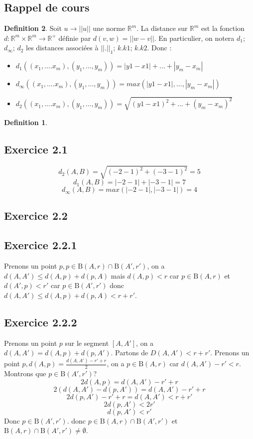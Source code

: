 \documentclass[]{book}
\theoremstyle{definition}
\newtheorem{defn}{Definition}
\newcommand{\bb}[1]{\mathbb{#1}}
\newcommand{\B}{\mathrm{B}}
\newcommand{\R}{\bb{R}}
\begin{document}
\subsection*{Rappel de cours}

\begin{defn}
Soit $u \to ||u||$ une norme $\R^m$. La distance sur $\R^m$ est la fonction $d : \R^m \times \R^m \to  \R^+$ d\'efinie par $d(v,w) = ||w - v||$.
En particulier, on notera $d_1$; $d_{\infty}$; $d_2$ les distances associées à $|| . ||_1$; $k . k1$; $k . k2$. Donc :
\begin{itemize}
\item $d_1((x_1, \ldots. x_m), (y_1, \ldots, y_m)) = |y1 - x1| + \ldots + |y_m - x_m|$
\item $d_{\infty}((x_1, \ldots. x_m), (y_1, \ldots, y_m)) = max(|y1 - x1|, \ldots, |y_m - x_m|)$
\item $d_2((x_1, \ldots. x_m), (y_1, \ldots, y_m)) = \sqrt{(y1 - x1)^2 + \ldots + (y_m - x_m)^2}$
\end{itemize}

\begin{defn}
\end{defn}



\end{defn}



\newpage
\subsection*{Exercice 2.1}
$$d_2(A,B)= \sqrt{(-2-1)^2+(-3-1)^2} = 5$$
$$d_1(A,B) = |-2-1|+|-3-1| = 7$$
$$d_{\infty}(A,B) = max(|-2-1|,|-3-1|) = 4$$

\subsection*{Exercice 2.2}
\subsection*{Exercice 2.2.1}
Prenons un point $p, p \in \B(A,r) \cap \B(A',r')$, on a $d(A,A') \leq d(A,p)+d(p,A)$ mais $d(A,p) < r$ car $p \in \B(A,r)$ et $d(A',p) < r'$ car $p \in \B(A',r')$
donc $d(A,A') \leq d(A,p)+d(p,A) < r +r'$.

\subsection*{Exercice 2.2.2}
Prenons un point $p$  sur le segment $[A,A']$, on a $d(A,A')=d(A,p)+d(p,A')$. Partons de $D(A,A')< r+r'$. Prenons un point $p, d(A,p)=\frac{d(A,A')-r'+r}{2}$, on a $p \in \B(A,r)$ car $d(A,A') - r' < r$. Montrons que $p \in \B(A',r')$? 
$$2d(A,p)=d(A,A')-r'+r$$
$$2(d(A,A')-d(p,A'))=d(A,A')-r'+r$$
$$2d(p,A')-r'+r=d(A,A')<r+r'$$
$$2d(p,A')<2r'$$
$$d(p,A')<r'$$
Donc $p \in \B(A',r')$. donc $p \in \B(A,r) \cap \B(A',r')$ et $\B(A,r) \cap \B(A',r') \neq \emptyset$.
\end{document}
